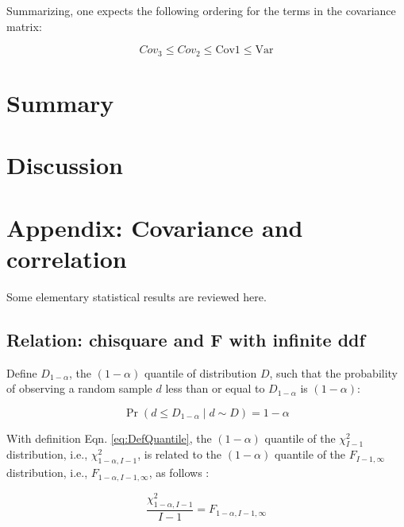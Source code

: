 \documentclass[
]{book}
\begin{document}
Summarizing, one expects the following ordering for the terms in the covariance matrix:

\begin{equation}
Cov_3 \leq  Cov_2 \leq  \text{Cov1} \leq  \text{Var}
\label{eq:CovOrderings}
\end{equation}

\hypertarget{or-method-intro-summary}{%
\section{Summary}\label{or-method-intro-summary}}

\hypertarget{or-method-intro-discussion}{%
\section{Discussion}\label{or-method-intro-discussion}}

\hypertarget{or-method-intro-elementary-stats}{%
\section{Appendix: Covariance and correlation}\label{or-method-intro-elementary-stats}}

Some elementary statistical results are reviewed here.

\hypertarget{or-method-intro-elementary-stats-f-stat-chisq-stat}{%
\subsection{Relation: chisquare and F with infinite ddf}\label{or-method-intro-elementary-stats-f-stat-chisq-stat}}

Define \(D_{1-\alpha}\), the \((1-\alpha)\) quantile of distribution \(D\), such that the probability of observing a random sample \(d\) less than or equal to \(D_{1-\alpha}\) is \((1-\alpha)\):

\begin{equation}
\Pr(d\leq D_{1-\alpha} \mid d \sim D)=1-\alpha
\label{eq:DefQuantile}
\end{equation}

With definition Eqn. \eqref{eq:DefQuantile}, the \((1-\alpha)\) quantile of the \(\chi_{I-1}^2\) distribution, i.e., \(\chi_{1-\alpha,I-1}^2\), is related to the \((1-\alpha)\) quantile of the \(F_{I-1,\infty}\) distribution, i.e., \(F_{1-\alpha,I-1,\infty}\), as follows \citep[see][Eq. 22]{RN1772}:

\begin{equation}
\frac{\chi_{1-\alpha,I-1}^{2}}{I-1} = F_{1-\alpha,I-1,\infty}
\label{eq:Chisqr2F}
\end{equation}
\end{document}
